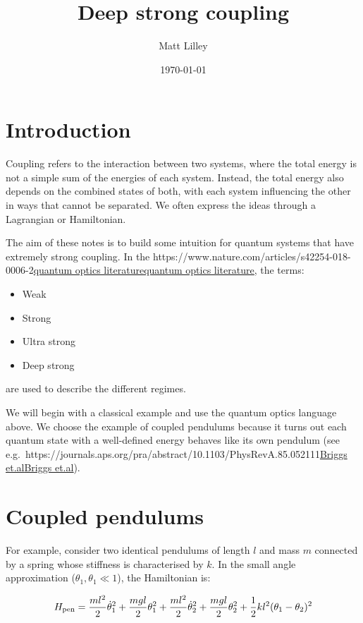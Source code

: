 \documentclass[
]{article}
\title{Deep strong coupling}
\author{Matt Lilley}
\date{\today}  %
\let\oldhref\href
\renewcommand{\href}[2]{\ifx#1\urlprefix\oldhref{#1}{#2}\else\uline{\oldhref{#1}{#2}}\fi}
\renewcommand{\[}{\begin{equation}}
\renewcommand{\]}{\end{equation}}
\providecommand{\tightlist}{%
  \setlength{\itemsep}{0pt}\setlength{\parskip}{0pt}}
\begin{document}
\maketitle

\section{Introduction}\label{introduction}

Coupling refers to the interaction between two systems, where the total
energy is not a simple sum of the energies of each system. Instead, the
total energy also depends on the combined states of both, with each
system influencing the other in ways that cannot be separated. We often
express the ideas through a Lagrangian or Hamiltonian.

The aim of these notes is to build some intuition for quantum systems
that have extremely strong coupling. In the
\href{https://www.nature.com/articles/s42254-018-0006-2}{quantum optics
literature}, the terms:

\begin{itemize}
\tightlist
\item
  Weak
\item
  Strong
\item
  Ultra strong
\item
  Deep strong
\end{itemize}

are used to describe the different regimes.

We will begin with a classical example and use the quantum optics
language above. We choose the example of coupled pendulums because it
turns out each quantum state with a well-defined energy behaves like its
own pendulum (see
e.g.~\href{https://journals.aps.org/pra/abstract/10.1103/PhysRevA.85.052111}{Briggs
et.al}).

\section{Coupled pendulums}\label{coupled-pendulums}

For example, consider two identical pendulums of length \(l\) and mass
\(m\) connected by a spring whose stiffness is characterised by \(k\).
In the small angle approximation (\(\theta_1, \theta_1 \ll 1\)), the
Hamiltonian is:

\[
H_{\rm pen} = \frac{m l^2}{2} \dot{\theta}_1^2 + \frac{m g l}{2} \theta_1^2 + \frac{m l^2}{2} \dot{\theta}_2^2 + \frac{m g l}{2} \theta_2^2 + \frac{1}{2} k l^2(\theta_1 - \theta_2)^2
\]
\end{document}
